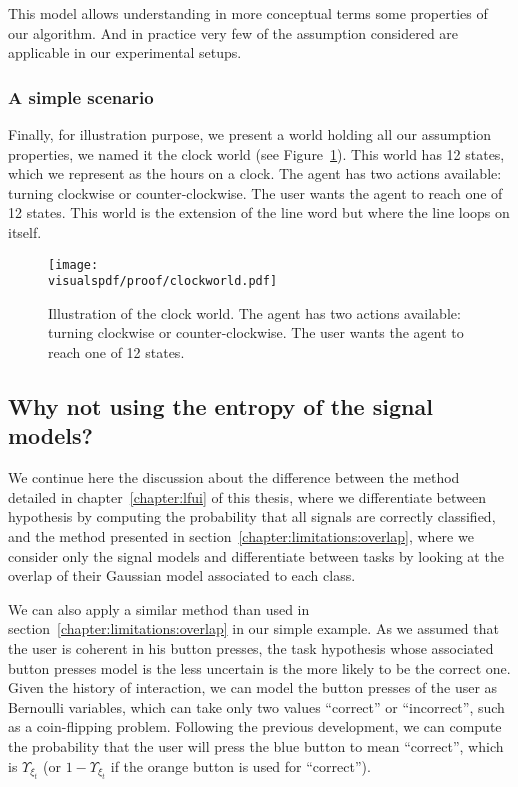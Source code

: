 This model allows understanding in more conceptual terms some properties of our algorithm. And in practice very few of the assumption considered are applicable in our experimental setups.

\visuopti{\newpage}

\subsubsection*{A simple scenario}

Finally, for illustration purpose, we present a world holding all our assumption properties, we named it the clock world (see Figure~\ref{fig:clockworld}). This world has 12 states, which we represent as the hours on a clock. The agent has two actions available: turning clockwise or counter-clockwise. The user wants the agent to reach one of 12 states. This world is the extension of the line word but where the line loops on itself.

\begin{figure}[!htbp]
\centering
\texttt{[image: \\visualspdf/proof/clockworld.pdf]}
\caption{Illustration of the clock world. The agent has two actions available: turning clockwise or counter-clockwise. The user wants the agent to reach one of 12 states.}
\label{fig:clockworld}
\end{figure} 

\subsection{Why not using the entropy of the signal models?}

We continue here the discussion about the difference between the method detailed in chapter~\ref{chapter:lfui} of this thesis, where we differentiate between hypothesis by computing the probability that all signals are correctly classified, and the method presented in section~\ref{chapter:limitations:overlap}, where we consider only the signal models and differentiate between tasks by looking at the overlap of their Gaussian model associated to each class.


We can also apply a similar method than used in section~\ref{chapter:limitations:overlap} in our simple example. As we assumed that the user is coherent in his button presses, the task hypothesis whose associated button presses model is the less uncertain is the more likely to be the correct one. Given the history of interaction, we can model the button presses of the user as Bernoulli variables, which can take only two values ``correct'' or ``incorrect'', such as a coin-flipping problem. Following the previous development, we can compute the probability that the user will press the blue button to mean ``correct'', which is $\Upsilon_{\xi_t}$ (or $1-\Upsilon_{\xi_t}$ if the orange button is used for ``correct'').

